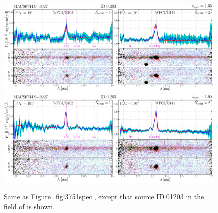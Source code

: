 \begin{figure}
    \includegraphics[width=\textwidth]{fig/clM0744_id01203_pa019_ELfig.png}
    \includegraphics[width=\textwidth]{fig/clM0744_id01203_pa104_ELfig.png}
    \caption[Same as Figure~\ref{fig:3751spec}, except that source ID 01203 in the field of \clba is shown.]
    {Same as Figure~\ref{fig:3751spec}, except that source ID 01203 in the field of \clba is shown.}
    \label{fig:1203spec}
\end{figure}


